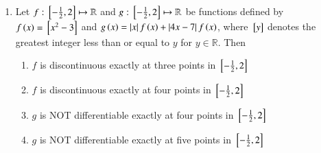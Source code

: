 \documentclass[journal]{IEEEtran}
\numberwithin{equation}{enumi}
\numberwithin{figure}{enumi}
\begin{document}
\begin{enumerate}
    \item 
	    Let $f:{}\left[-\frac{1}{2}, 2\right]\mapsto \mathbb{R}$ and $g:{}\left[-\frac{1}{2}, 2\right]\mapsto \mathbb{R}$ be functions defined by $f\left(x\right)={}\left[x^2-3\right]$ and $g\left(x\right)=\left\vert x\right\vert f\left(x\right)+\left\vert4x-7\right\vert f\left(x\right)$, where ${}\left[y\right]$ denotes the greatest integer less than or equal to $y$ for $y\in \mathbb{R}$. Then 

    \hfill{}
    
    \begin{enumerate}        
        \item $f$ is discontinuous exactly at three points in ${}\left[-\frac{1}{2}, 2\right]$
        \item $f$ is discontinuous exactly at four points in ${}\left[-\frac{1}{2}, 2\right]$
        \item $g$ is NOT differentiable exactly at four points in ${}\left[-\frac{1}{2}, 2\right]$
        \item $g$ is NOT differentiable exactly at five points in ${}\left[-\frac{1}{2}, 2\right]$
    \end{enumerate}

\end{enumerate}
\end{document}
